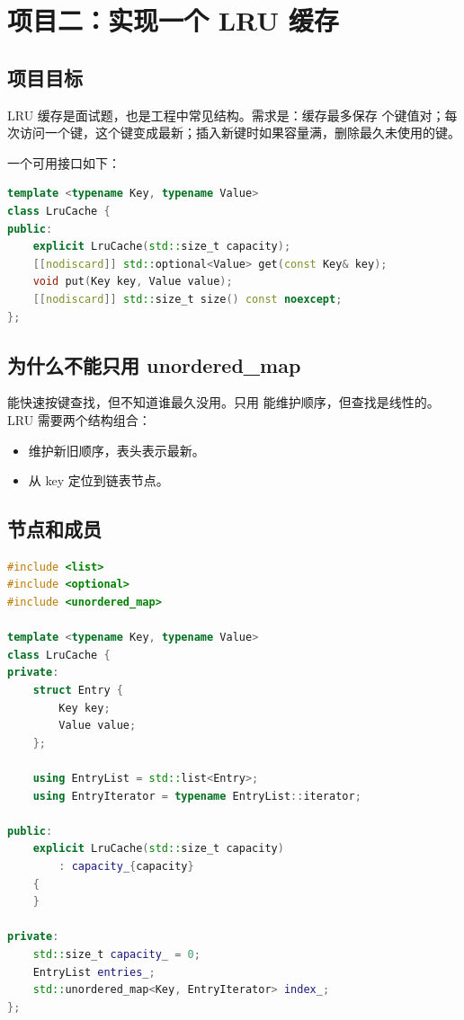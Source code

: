 \chapter{项目二：实现一个 LRU 缓存}

\section{项目目标}

LRU 缓存是面试题，也是工程中常见结构。需求是：缓存最多保存  个键值对；每次访问一个键，这个键变成最新；插入新键时如果容量满，删除最久未使用的键。

一个可用接口如下：

\begin{lstlisting}[language=C++,caption={LRU 缓存接口}]
template <typename Key, typename Value>
class LruCache {
public:
    explicit LruCache(std::size_t capacity);
    [[nodiscard]] std::optional<Value> get(const Key& key);
    void put(Key key, Value value);
    [[nodiscard]] std::size_t size() const noexcept;
};
\end{lstlisting}

\section{为什么不能只用 unordered\_map}

 能快速按键查找，但不知道谁最久没用。只用  能维护顺序，但查找是线性的。LRU 需要两个结构组合：

\begin{itemize}
  \item {} 维护新旧顺序，表头表示最新。
  \item {} 从 key 定位到链表节点。
\end{itemize}

\section{节点和成员}

\begin{lstlisting}[language=C++,caption={LRU 的内部结构}]
#include <list>
#include <optional>
#include <unordered_map>

template <typename Key, typename Value>
class LruCache {
private:
    struct Entry {
        Key key;
        Value value;
    };

    using EntryList = std::list<Entry>;
    using EntryIterator = typename EntryList::iterator;

public:
    explicit LruCache(std::size_t capacity)
        : capacity_{capacity}
    {
    }

private:
    std::size_t capacity_ = 0;
    EntryList entries_;
    std::unordered_map<Key, EntryIterator> index_;
};
\end{lstlisting}

